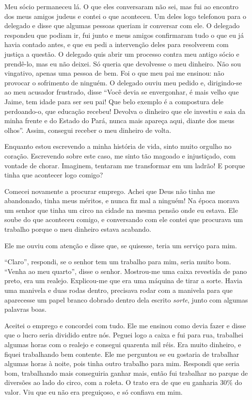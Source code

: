 Meu sócio permaneceu lá. O que eles conversaram não sei, mas fui ao
encontro dos meus amigos judeus e contei o que aconteceu. Um deles
logo telefonou para o delegado e disse que algumas pessoas queriam ir
conversar com ele. O delegado respondeu que podiam ir, fui junto e 
meus amigos confirmaram tudo o que eu já havia contado antes, e que eu
pedi a intervenção deles para resolverem com justiça a questão. O
delegado quis abrir um processo contra meu antigo sócio e prendê-lo,
mas eu não deixei. Só queria que devolvesse o meu dinheiro. Não sou
vingativo, apenas uma pessoa de bem. Foi o que meu pai me ensinou: não
provocar o sofrimento de ninguém. O delegado ouviu meu pedido e,
dirigindo-se ao meu acusador frustrado, disse ``Você devia se
envergonhar, é mais velho que Jaime, tem idade para ser seu pai! Que
belo exemplo é a compostura dele perdoando-o, que educação recebeu!
Devolva o dinheiro que ele investiu e saia da minha frente e do Estado
do Pará, nunca mais apareça aqui, diante dos meus olhos''. Assim, 
consegui receber o meu dinheiro de volta.

Enquanto estou escrevendo a minha história de vida, sinto muito orgulho
no coração. Escrevendo sobre este caso, me sinto tão magoado e
injustiçado, com vontade de chorar. Imaginem, tentaram me transformar em
um ladrão! E porque tinha que acontecer logo comigo?

Comecei novamente a procurar emprego. Achei
que Deus não tinha me abandonado, tinha meus méritos, e nunca fiz 
mal a ninguém! Na época morava
um senhor que tinha um circo na cidade na mesma pensão onde eu estava. Ele soube do que
aconteceu comigo, e conversando com ele contei que procurava um trabalho
porque o meu dinheiro estava acabando.

Ele me ouviu com atenção e disse que, se quisesse, teria um serviço para
mim.

``Claro'', respondi, se o senhor tem um trabalho para mim, seria muito
bom. ``Venha ao meu quarto'', disse o senhor. Mostrou-me uma caixa
revestida de pano preto, era um realejo. Explicou-me que era uma máquina
de tirar a sorte. Havia uma manivela e duas rodas dentro, precisava 
rodar com a manivela para que aparecesse um papel branco dobrado dentro
dela escrito \textit{sorte}, junto com algumas palavras boas.

Aceitei o emprego e concordei com tudo. Ele me ensinou como devia fazer
e disse que o lucro seria dividido entre nós. Peguei logo a caixa e
fui para rua, trabalhei algumas horas com o realejo e consegui quarenta
mil réis. Era muito dinheiro, e fiquei trabalhando bem contente.
Ele me perguntou se eu gostaria de trabalhar algumas horas à noite, pois
tinha outro trabalho para mim. Respondi que seria bom, trabalhando mais
conseguiria ganhar mais, então fui trabalhar no parque de diversões ao
lado do circo, com a roleta. O trato era de que eu ganharia 30\% do valor. Viu que eu
não era preguiçoso, e só confiava em mim.

